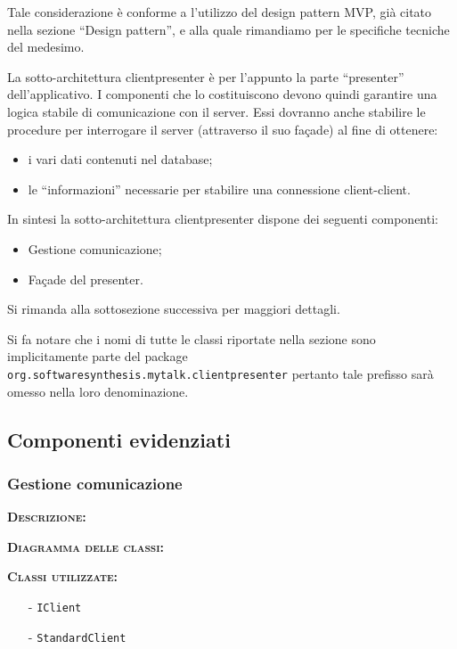 Tale considerazione è conforme a l'utilizzo del design pattern MVP, già citato nella sezione ``Design pattern'', e alla quale rimandiamo per le specifiche tecniche del medesimo.

La sotto-architettura clientpresenter è per l'appunto la parte ``presenter'' dell'applicativo. I componenti che lo costituiscono devono quindi garantire una logica stabile di comunicazione con il server. Essi dovranno anche stabilire le procedure per interrogare il server (attraverso il suo façade) al fine di ottenere:
\begin{itemize}
	\item i vari dati contenuti nel database;
	\item le ``informazioni'' necessarie per stabilire una connessione client-client.
\end{itemize}

In sintesi la sotto-architettura clientpresenter dispone dei seguenti componenti:
\begin{itemize}
	\item Gestione comunicazione;
	\item Façade del presenter.
\end{itemize}
Si rimanda alla sottosezione successiva per maggiori dettagli.

Si fa notare che i nomi di tutte le classi riportate nella sezione sono implicitamente parte del package \texttt{org.softwaresynthesis.mytalk.clientpresenter} pertanto tale prefisso sarà omesso nella loro denominazione.

\subsection{Componenti evidenziati}

\subsubsection{Gestione comunicazione}
\begin{description}
	\item{\scshape\bfseries Descrizione:} 
		
	\item{\scshape\bfseries Diagramma delle classi:}
	\item{\scshape\bfseries Classi utilizzate:} 
	\begin{itemize}[noitemsep,nolistsep]
		\item[-] \texttt{IClient}
		\item[-] \texttt{StandardClient}
	\end{itemize}  
\end{description}

